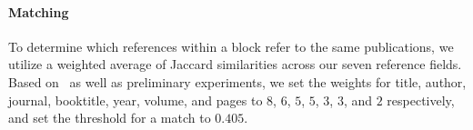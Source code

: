 


\paragraph{Matching}

To determine which references within a block refer to the same publications, we utilize a weighted average of Jaccard similarities across our seven reference fields. Based on~\cite{Foufoulas2017} as well as preliminary experiments, we set the weights for title, author, journal, booktitle, year, volume, and pages to $8$, $6$, $5$, $5$, $3$, $3$, and $2$ respectively, and set the threshold for a match to $0.405$.



